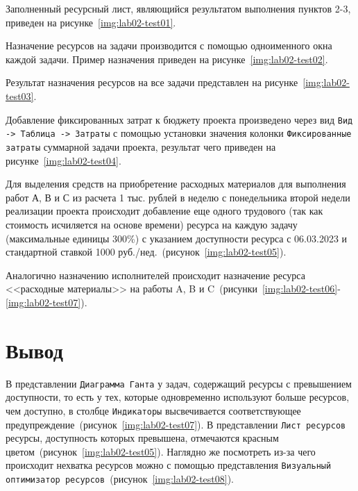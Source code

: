 Заполненный ресурсный лист, являющийся результатом выполнения пунктов 2-3,
приведен на рисунке~\ref{img:lab02-test01}.


Назначение ресурсов на задачи производится с помощью одноименного окна каждой
задачи. Пример назначения приведен на рисунке~\ref{img:lab02-test02}.


Результат назначения ресурсов на все задачи представлен на
рисунке~\ref{img:lab02-test03}.


Добавление фиксированных затрат к бюджету проекта произведено через вид
\texttt{Вид -> Таблица -> Затраты} с помощью установки значения колонки
\texttt{Фиксированные затраты} суммарной задачи проекта, результат чего
приведен на рисунке~\ref{img:lab02-test04}.


Для выделения средств на приобретение расходных материалов для выполнения работ
А, В и С из расчета 1 тыс. рублей в неделю с понедельника второй недели
реализации проекта происходит добавление еще одного трудового (так как
стоимость исчиляется на основе времени) ресурса на каждую задачу (максимальные
единицы 300\%) с указанием доступности ресурса с 06.03.2023 и стандартной
ставкой 1000 руб./нед.~(рисунок~\ref{img:lab02-test05}).


Аналогично назначению исполнителей происходит назначение ресурса <<расходные
материалы>> на работы A, B и
C~(рисунки~\ref{img:lab02-test06}-\ref{img:lab02-test07}).



\section*{Вывод}

В представлении \texttt{Диаграмма Ганта} у задач, содержащий ресурсы с
превышением доступности, то есть у тех, которые одновременно используют больше
ресурсов, чем доступно, в столбце \texttt{Индикаторы} высвечивается
соответствующее предупреждение~(рисунок~\ref{img:lab02-test07}). В представлении
\texttt{Лист ресурсов} ресурсы, доступность которых превышена, отмечаются
красным цветом~(рисунок~\ref{img:lab02-test05}). Наглядно же посмотреть из-за
чего происходит нехватка ресурсов можно с помощью представления
\texttt{Визуальный оптимизатор ресурсов}~(рисунок~\ref{img:lab02-test08}). 

